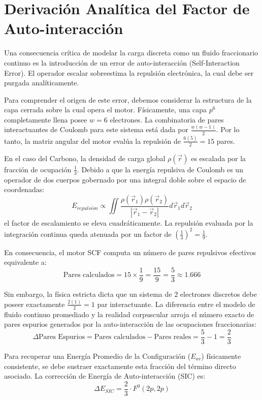 \documentclass[11pt, a4paper]{article}
\begin{document}
\section{Derivación Analítica del Factor de Auto-interacción}
Una consecuencia crítica de modelar la carga discreta como un fluido fraccionario continuo es la introducción de un error de auto-interacción (Self-Interaction Error). El operador escalar sobreestima la repulsión electrónica, la cual debe ser purgada analíticamente.

Para comprender el origen de este error, debemos considerar la estructura de la capa cerrada sobre la cual opera el motor. Físicamente, una capa $p^6$ completamente llena posee $w=6$ electrones. La combinatoria de pares interactuantes de Coulomb para este sistema está dada por $\frac{w(w-1)}{2}$. Por lo tanto, la matriz angular del motor evalúa la repulsión de $\frac{6(5)}{2} = 15$ pares.

En el caso del Carbono, la densidad de carga global $\rho(\vec{r})$ es escalada por la fracción de ocupación $\frac{1}{3}$. Debido a que la energía repulsiva de Coulomb es un operador de dos cuerpos gobernado por una integral doble sobre el espacio de coordenadas:
\[ E_{repulsi\acute{o}n} \propto \iint \frac{\rho(\vec{r}_1)\rho(\vec{r}_2)}{|\vec{r}_1 - \vec{r}_2|} d\vec{r}_1 d\vec{r}_2 \]
el factor de escalamiento se eleva cuadráticamente. La repulsión evaluada por la integración continua queda atenuada por un factor de $\left(\frac{1}{3}\right)^2 = \frac{1}{9}$.

En consecuencia, el motor SCF computa un número de pares repulsivos efectivos equivalente a:
\[ \text{Pares calculados} = 15 \times \frac{1}{9} = \frac{15}{9} = \frac{5}{3} \approx 1.666 \]

Sin embargo, la física estricta dicta que un sistema de $2$ electrones discretos debe poseer exactamente $\frac{2(1)}{2} = 1$ par interactuante. La diferencia entre el modelo de fluido continuo promediado y la realidad corpuscular arroja el número exacto de pares espurios generados por la auto-interacción de las ocupaciones fraccionarias:
\[ \Delta \text{Pares Espurios} = \text{Pares calculados} - \text{Pares reales} = \frac{5}{3} - 1 = \frac{2}{3} \]

Para recuperar una Energía Promedio de la Configuración ($E_{av}$) físicamente consistente, se debe sustraer exactamente esta fracción del término directo asociado. La corrección de Energía de Auto-interacción (SIC) es:
\[ \Delta E_{SIC} = \frac{2}{3} \cdot F^0(2p, 2p) \]
\end{document}
